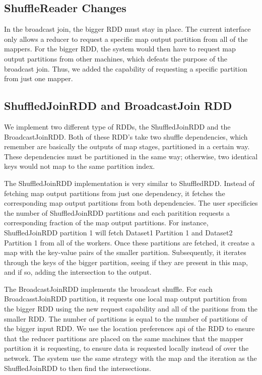 \subsection{ShuffleReader Changes}

In the broadcast join, the bigger RDD must stay in place. The current interface only allows a reducer to request a specific map output partition
from all of the mappers. For the bigger RDD, the system would then have to request map output partitions from other machines, which defeats the purpose of the broadcast join. Thus, we added the capability of requesting a specific partition from just one mapper. 

\subsection{ShuffledJoinRDD and BroadcastJoin RDD}

We implement two different type of RDDs, the ShuffledJoinRDD and the
BroadcastJoinRDD. Both of these RDD's take two shuffle dependencies, which remember
are basically the outputs of map stages, partitioned in a certain way. These 
dependencies must be partitioned in the same way; otherwise, two identical keys would not map to the same partition index.  


The ShuffledJoinRDD implementation is very similar to ShuffledRDD. Instead of fetching map output partitions
from just one dependency, it fetches the corresponding map output partitions from both dependencies.   
The user specificies the number of ShuffledJoinRDD partitions and each paritition requests a corresponding fraction
of the map output partitions.
For instance, ShuffledJoinRDD partition 1 will fetch Dataset1 Partition 1 and Dataset2
Partition 1 from all of the workers. Once these partitions are fetched, it creatse a map with the key-value pairs of the smaller partition.
Subsequently, it iterates through the keys of the bigger partition, seeing if they are present in this map, and if so, adding the intersection to the output.

The BroadcastJoinRDD implements the broadcast shuffle.
For each BroadcasstJoinRDD partition, it requests one local map output partition from the bigger RDD using the new request capability and  
all of the paritions from the smaller RDD. The number of partitions is equal to the number of partitions of the bigger input RDD. We use the location
preferences api of the RDD to ensure that the reducer partitions are placed on the same machines that the mapper partition it is requesting, to ensure data is
requested locally instead of over the network. The system use the same strategy with the map and the iteration as the ShuffledJoinRDD to then find the intersections.

